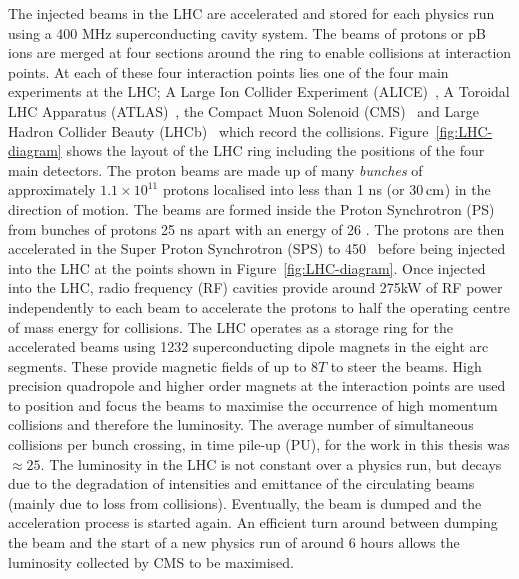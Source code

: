 The injected beams in the LHC are accelerated and stored for each physics run using 
a 400 MHz superconducting cavity system. The beams of protons or pB ions 
are merged at four sections around the ring to enable collisions at interaction points.
At each of these four interaction points lies one of the four main 
experiments at the LHC; A Large Ion Collider Experiment (ALICE)~\cite{ALICE},
A Toroidal LHC Apparatus (ATLAS)~\cite{ATLAS}, the Compact Muon Solenoid (CMS)~\cite{CMS}
and Large Hadron Collider Beauty (LHCb)~\cite{LHCb} which record the collisions. Figure~\ref{fig:LHC-diagram} shows the layout of the LHC ring including
the positions of the four main detectors. The proton beams are made up of many \emph{bunches} of approximately $1.1\times10^{11}$
protons localised into less than 1 ns (or 30$\,\text{cm}$) in the direction of motion.
The beams are formed inside the Proton Synchrotron (PS) from bunches of protons 25 ns apart with an energy of 26 \GeV. 
The protons are then accelerated in the Super Proton Synchrotron (SPS) to 450 \GeV~before being injected into the LHC at
the points shown in Figure~\ref{fig:LHC-diagram}. Once injected into the LHC, radio frequency (RF) cavities 
provide around 275kW of RF power independently to each beam to accelerate the protons
to half the operating centre of mass energy for collisions.
The LHC operates as a storage ring for the accelerated beams using 1232 
superconducting dipole magnets in the eight arc segments. These provide magnetic fields of up to $8T$ to steer the beams. 
High precision quadropole and higher order magnets at the interaction points are used to position and focus the beams to 
maximise the occurrence of high momentum collisions and therefore the luminosity. The average number of simultaneous collisions
per bunch crossing, in time pile-up (PU), for the work in this thesis was $\approx25$.
The luminosity in the LHC is not constant over a physics run, but decays due to the degradation 
of intensities and emittance of the circulating beams (mainly due to loss from collisions). Eventually,
the beam is dumped and the acceleration process is started again. An efficient turn around between
dumping the beam and the start of a new physics run of 
around 6 hours allows the luminosity collected by CMS to be maximised. 

